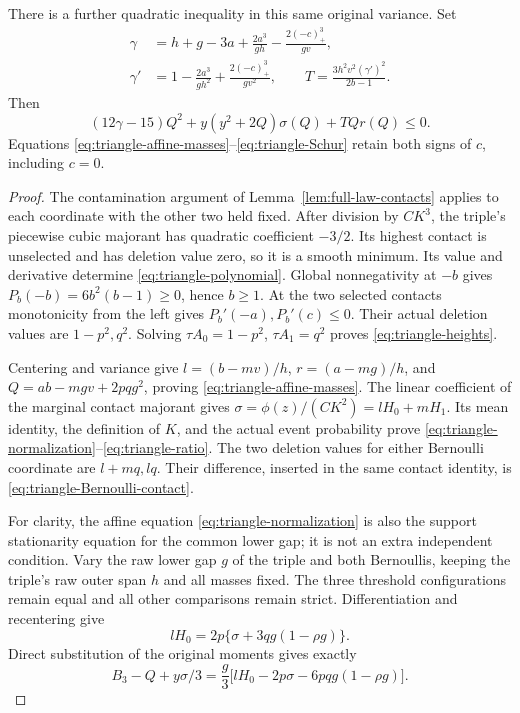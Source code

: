 \begin{theorem}
There is a further quadratic inequality in this same original variance.
Set
\begin{align*}
 \gamma&=h+g-3a+\frac{2a^3}{gh}
                         -\frac{2(-c)_+^3}{gv},\\
 \gamma'&=1-\frac{2a^3}{gh^2}
                         +\frac{2(-c)_+^3}{gv^2},\qquad
 T=\frac{3h^2v^2(\gamma')^2}{2b-1}.
\end{align*}
Then
\begin{equation}\label{eq:triangle-Schur}
 (12\gamma-15)Q^2+y(y^2+2Q)\sigma(Q)+TQr(Q)\le0.
\end{equation}
Equations \eqref{eq:triangle-affine-masses}--\eqref{eq:triangle-Schur}
retain both signs of $c$, including $c=0$.
\end{theorem}

\begin{proof}
The contamination argument of Lemma~\ref{lem:full-law-contacts} applies
to each coordinate with the other two held fixed. After division by
$CK^3$, the triple's piecewise cubic majorant has quadratic coefficient $-3/2$.
Its highest contact is unselected and has deletion value zero, so it
is a smooth minimum. Its value and derivative determine
\eqref{eq:triangle-polynomial}. Global nonnegativity at $-b$ gives
$P_b(-b)=6b^2(b-1)\ge0$, hence $b\ge1$.
At the two selected contacts monotonicity from the left gives
$P_b'(-a),P_b'(c)\le0$. Their actual deletion values are
$1-p^2,q^2$. Solving $\tau A_0=1-p^2$, $\tau A_1=q^2$ proves
\eqref{eq:triangle-heights}.

Centering and variance give $l=(b-mv)/h$, $r=(a-mg)/h$, and
$Q=ab-mgv+2pqg^2$, proving \eqref{eq:triangle-affine-masses}.
The linear coefficient of the marginal contact majorant gives
$\sigma=\phi(z)/(CK^2)=lH_0+mH_1$. Its mean identity, the definition
of $K$, and the actual event probability prove
\eqref{eq:triangle-normalization}--\eqref{eq:triangle-ratio}.
The two deletion values for either Bernoulli coordinate are
$l+mq,lq$. Their difference, inserted in the same contact identity,
is \eqref{eq:triangle-Bernoulli-contact}.

For clarity, the affine equation \eqref{eq:triangle-normalization}
is also the support stationarity equation for the common lower gap;
it is not an extra independent condition. Vary the raw lower gap $g$
of the triple and both Bernoullis, keeping the triple's raw outer
span $h$ and all masses fixed. The three threshold configurations
remain equal and all other comparisons remain strict. Differentiation
and recentering give
\[
 lH_0=2p\{\sigma+3qg(1-\rho g)\}.
\]
Direct substitution of the original moments gives exactly
\[
 B_3-Q+y\sigma/3
 =\frac g3\bigl[lH_0-2p\sigma-6pqg(1-\rho g)\bigr].
\]


\end{proof}
